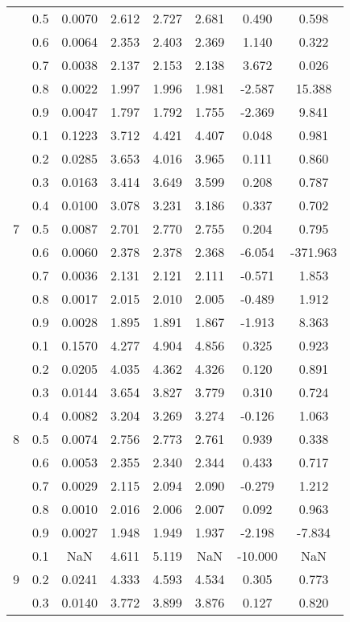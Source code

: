 \documentclass[11pt,a4paper]{report}
\begin{document}
\begin{longtable}{ | c | c || c | c | c | c | c | c | }
 & 0.5 & 0.0070 & 2.612 & 2.727 & 2.681 & 0.490 & 0.598 \\
 & 0.6 & 0.0064 & 2.353 & 2.403 & 2.369 & 1.140 & 0.322 \\
 & 0.7 & 0.0038 & 2.137 & 2.153 & 2.138 & 3.672 & 0.026 \\
 & 0.8 & 0.0022 & 1.997 & 1.996 & 1.981 & -2.587 & 15.388 \\
 & 0.9 & 0.0047 & 1.797 & 1.792 & 1.755 & -2.369 & 9.841 \\
 \hline
\multirow{9}{*}{7} & 0.1 & 0.1223 & 3.712 & 4.421 & 4.407 & 0.048 & 0.981 \\
 & 0.2 & 0.0285 & 3.653 & 4.016 & 3.965 & 0.111 & 0.860 \\
 & 0.3 & 0.0163 & 3.414 & 3.649 & 3.599 & 0.208 & 0.787 \\
 & 0.4 & 0.0100 & 3.078 & 3.231 & 3.186 & 0.337 & 0.702 \\
 & 0.5 & 0.0087 & 2.701 & 2.770 & 2.755 & 0.204 & 0.795 \\
 & 0.6 & 0.0060 & 2.378 & 2.378 & 2.368 & -6.054 & -371.963 \\
 & 0.7 & 0.0036 & 2.131 & 2.121 & 2.111 & -0.571 & 1.853 \\
 & 0.8 & 0.0017 & 2.015 & 2.010 & 2.005 & -0.489 & 1.912 \\
 & 0.9 & 0.0028 & 1.895 & 1.891 & 1.867 & -1.913 & 8.363 \\
 \hline
\multirow{9}{*}{8} & 0.1 & 0.1570 & 4.277 & 4.904 & 4.856 & 0.325 & 0.923 \\
 & 0.2 & 0.0205 & 4.035 & 4.362 & 4.326 & 0.120 & 0.891 \\
 & 0.3 & 0.0144 & 3.654 & 3.827 & 3.779 & 0.310 & 0.724 \\
 & 0.4 & 0.0082 & 3.204 & 3.269 & 3.274 & -0.126 & 1.063 \\
 & 0.5 & 0.0074 & 2.756 & 2.773 & 2.761 & 0.939 & 0.338 \\
 & 0.6 & 0.0053 & 2.355 & 2.340 & 2.344 & 0.433 & 0.717 \\
 & 0.7 & 0.0029 & 2.115 & 2.094 & 2.090 & -0.279 & 1.212 \\
 & 0.8 & 0.0010 & 2.016 & 2.006 & 2.007 & 0.092 & 0.963 \\
 & 0.9 & 0.0027 & 1.948 & 1.949 & 1.937 & -2.198 & -7.834 \\
 \hline
\multirow{9}{*}{9} & 0.1 & NaN & 4.611 & 5.119 & NaN & -10.000 & NaN \\
 & 0.2 & 0.0241 & 4.333 & 4.593 & 4.534 & 0.305 & 0.773 \\
 & 0.3 & 0.0140 & 3.772 & 3.899 & 3.876 & 0.127 & 0.820 \\

\end{longtable}
\end{document}
